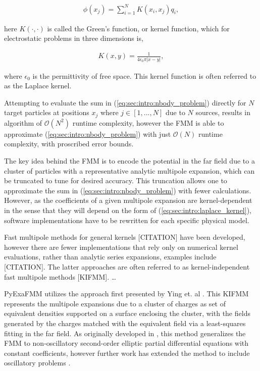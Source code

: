 \documentclass{IEEEcsmag}
\begin{document}
\begin{eqnarray}
	\phi(x_j) = \sum_{i=1}^{N} K(x_i, x_j) q_i,
\label{eq:sec:intro:nbody_problem}
\end{eqnarray}

here $K(\cdot, \cdot)$ is called the Green's function, or kernel function, which for electrostatic problems in three dimensions is,

\begin{eqnarray}
	K(x, y) = \frac{1}{4\epsilon_0\pi|x-y|},
\label{eq:sec:intro:laplace_kernel}
\end{eqnarray}

where $\epsilon_0$ is the permittivity of free space. This kernel function is often referred to as the Laplace kernel.

Attempting to evaluate the sum in (\ref{eq:sec:intro:nbody_problem}) directly for $N$ target particles at positions $x_j$ where $j \in [1,...,N]$ due to $N$ sources, results in algorithm of $\mathcal{O}(N^2)$ runtime complexity, however the FMM is able to approximate (\ref{eq:sec:intro:nbody_problem}) with just $\mathcal{O}(N)$ runtime complexity, with proscribed error bounds.

The key idea behind the FMM is to encode the potential in the far field due to a cluster of particles with a representative analytic multipole expansion, which can be truncated to tune for desired accuracy. This truncation
allows one to approximate the sum in (\ref{eq:sec:intro:nbody_problem}) with fewer calculations. However, as the coefficients of a given multipole expansion are kernel-dependent in the sense that they will depend on the form of (\ref{eq:sec:intro:laplace_kernel}), software implementations have to be rewritten for each specific physical model.

Fast multipole methods for general kernels [CITATION] have been developed, however there are fewer implementations that rely only on numerical kernel evaluations, rather than analytic series expansions, examples include [CITATION]. The latter approaches are often referred to as kernel-independent fast multipole methods [KIFMM]. \dots

PyExaFMM utilizes the approach first presented by Ying et. al \cite{Ying2004}. This KIFMM represents the multipole expansions due to a cluster of charges as set of equivalent densities supported on a surface enclosing the cluster, with the fields generated by the charges matched with the equivalent field via a least-squares fitting in the far field. As originally developed in \cite{Ying2004}, this method generalizes the FMM to non-oscillatory second-order elliptic partial differential equations with constant coefficients, however further work has extended the method to include oscillatory problems \cite{Engquist2007}.
\end{document}
